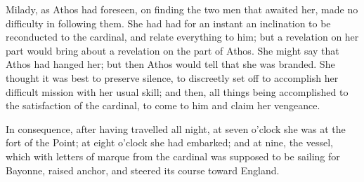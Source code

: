 Milady, as Athos had foreseen, on finding the two men that awaited her, made no difficulty in following them. She had had for an instant an inclination to be reconducted to the cardinal, and relate everything to him; but a revelation on her part would bring about a revelation on the part of Athos. She might say that Athos had hanged her; but then Athos would tell that she was branded. She thought it was best to preserve silence, to discreetly set off to accomplish her difficult mission with her usual skill; and then, all things being accomplished to the satisfaction of the cardinal, to come to him and claim her vengeance. 

In consequence, after having travelled all night, at seven o'clock she was at the fort of the Point; at eight o'clock she had embarked; and at nine, the vessel, which with letters of marque from the cardinal was supposed to be sailing for Bayonne, raised anchor, and steered its course toward England. 